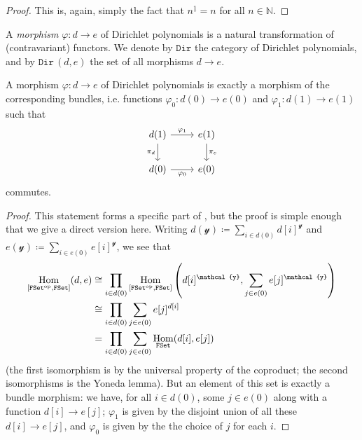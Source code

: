 \documentclass[11pt,fleqn]{article}
\newcommand{\yon}{\mathcal{y}}
\newcommand{\op}{^\textnormal{op}}
\newcommand{\cat}[1]{\mathtt{#1}}
\newcommand{\FSet}{\cat{FSet}}
\newcommand{\cDir}{\cat{Dir}}
\DeclareMathOperator{\Hom}{Hom}
\begin{document}
\begin{proof}
  This is, again, simply the fact that $n^{\underline{1}}=n$ for all $n\in\mathbb{N}$.
\end{proof}

\begin{definition}
  A \emph{morphism} $\varphi\colon d\to e$ of Dirichlet polynomials is a natural transformation of (contravariant) functors.
  We denote by $\cDir$ the category of Dirichlet polynomials, and by $\cDir\,(d,e)$ the set of all morphisms $d\to e$.
\end{definition}

\begin{lemma}
\label{lemma:morphism-of-dir-is-morphism-of-bund}
  A morphism $\varphi\colon d\to e$ of Dirichlet polynomials is exactly a morphism of the corresponding bundles, i.e. functions $\varphi_0\colon d(0)\to e(0)$ and $\varphi_1\colon d(1)\to e(1)$ such that
  \[
    \begin{tikzcd}
      d(1) \rar["\varphi_1"] \dar[swap,"\pi_d"]
      & e(1) \dar["\pi_e"]
    \\d(0) \rar[swap,"\varphi_0"]
      & e(0)
    \end{tikzcd}
  \]
  commutes.
\end{lemma}

\begin{proof}
  This statement forms a specific part of \cite[Theorem~4.6]{SM2020}, but the proof is simple enough that we give a direct version here.
  Writing $d(\yon)\coloneqq\sum_{i\in d(0)}d[i]^\yon$ and $e(\yon)\coloneqq\sum_{i\in e(0)}e[i]^\yon$, we see that
  \[
    \begin{aligned}
      \Hom_{[\FSet\op,\FSet]}(d,e)
      &\cong \prod_{i\in d(0)}\Hom_{[\FSet\op,\FSet]}\left(
        d[i]^\yon,
        \sum_{j\in e(0)}e[j]^\yon
      \right)
    \\&\cong \prod_{i\in d(0)}\sum_{j\in e(0)} e[j]^{d[i]}
    \\&= \prod_{i\in d(0)}\sum_{j\in e(0)} \Hom_{\FSet}(d[i],e[j])
    \end{aligned}
  \]
  (the first isomorphism is by the universal property of the coproduct;
  the second isomorphisms is the Yoneda lemma).
  But an element of this set is exactly a bundle morphism:
  we have, for all $i\in d(0)$, some $j\in e(0)$ along with a function $d[i]\to e[j]$;
  $\varphi_1$ is given by the disjoint union of all these $d[i]\to e[j]$, and $\varphi_0$ is given by the the choice of $j$ for each $i$.
\end{proof}
\end{document}
